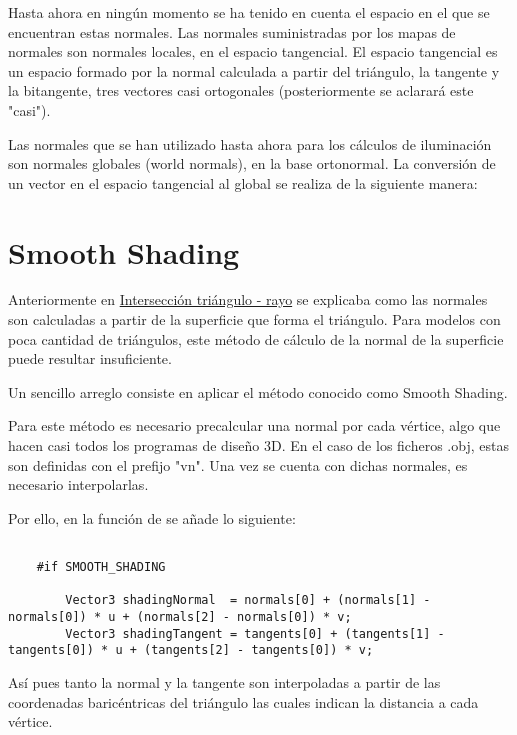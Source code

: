 Hasta ahora en ningún momento se ha tenido en cuenta el espacio en el que se encuentran estas normales. Las normales suministradas por los mapas de normales son normales locales, en el espacio tangencial. El espacio tangencial es un espacio formado por la normal calculada a partir del triángulo, la tangente y la bitangente, tres vectores casi ortogonales (posteriormente se aclarará este "casi").
	
Las normales que se han utilizado hasta ahora para los cálculos de iluminación son normales globales (world normals), en la base ortonormal. La conversión de un vector en el espacio tangencial al global se realiza de la siguiente manera: 
	
	
	
\section{Smooth Shading}
	
Anteriormente en \hyperref[subsec:triintersection]{Intersección triángulo - rayo} se explicaba como las normales son calculadas a partir de la superficie que forma el triángulo. Para modelos con poca cantidad de triángulos, este método de cálculo de la normal de la superficie puede resultar insuficiente.
	
Un sencillo arreglo consiste en aplicar el método conocido como Smooth Shading. 
	
Para este método es necesario precalcular una normal por cada vértice, algo que hacen casi todos los programas de diseño 3D. En el caso de los ficheros .obj, estas son definidas con el prefijo "vn". Una vez se cuenta con dichas normales, es necesario interpolarlas. 

Por ello, en la función  de  se añade lo siguiente:
	
\begin{lstlisting}
			
	#if SMOOTH_SHADING 

        Vector3 shadingNormal  = normals[0] + (normals[1] - normals[0]) * u + (normals[2] - normals[0]) * v;
        Vector3 shadingTangent = tangents[0] + (tangents[1] - tangents[0]) * u + (tangents[2] - tangents[0]) * v;

	\end{lstlisting}
			
Así pues tanto la normal y la tangente son interpoladas a partir de las coordenadas baricéntricas del triángulo  las cuales indican la distancia a cada vértice.
	
